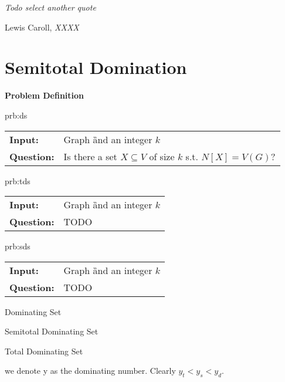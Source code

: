 \epigraph{\itshape Todo select another quote}{Lewis Caroll, \textit{XXXX}}


\section{Semitotal Domination}

\textbf{Problem Definition}

\begin{prb}{prb:ds}
    
    \begin{tabularx}{0.8\textwidth}{>{\hsize=0.35\hsize}X>{\hsize=0.65\hsize}X}
        \textbf{Input:} & Graph \G and an integer $k$\\
        \textbf{Question:} & Is there a set $X \subseteq V$ of size $k$ s.t. $N[X] = V(G)$? \\
    \end{tabularx}
        
\end{prb}

\begin{prb}{prb:tds}
    
    \begin{tabularx}{0.8\textwidth}{>{\hsize=0.35\hsize}X>{\hsize=0.65\hsize}X}
        \textbf{Input:} & Graph \G and an integer $k$\\
        \textbf{Question:} & TODO \\
    \end{tabularx}
        
\end{prb}

\begin{prb}{prb:sds}
    
    \begin{tabularx}{0.8\textwidth}{>{\hsize=0.35\hsize}X>{\hsize=0.65\hsize}X}
        \textbf{Input:} & Graph \G and an integer $k$\\
        \textbf{Question:} & TODO \\
    \end{tabularx}
        
\end{prb}




Dominating Set



Semitotal Dominating Set

Total Dominating Set

we denote y as the dominating number. Clearly $y_t < y_s < y_d$.

